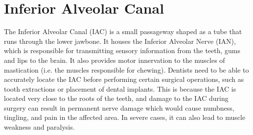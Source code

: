 \section{Inferior Alveolar Canal}
The Inferior Alveolar Canal (IAC) is a small passageway shaped as a tube that
runs through the lower jawbone. It houses the Inferior Alveolar Nerve (IAN),
which is responsible for transmitting sensory information from the teeth, gums
and lips to the brain. It also provides motor innervation to the muscles of
mastication (i.e. the muscles responsible for chewing). Dentists need to be able
to accurately locate the IAC before performing certain surgical operations, such
as tooth extractions or placement of dental implants. This is because the IAC is
located very close to the roots of the teeth, and damage to the IAC during
surgery can result in permanent nerve damage which would cause numbness,
tingling, and pain in the affected area. In severe cases, it can also lead to
muscle weakness and paralysis.

